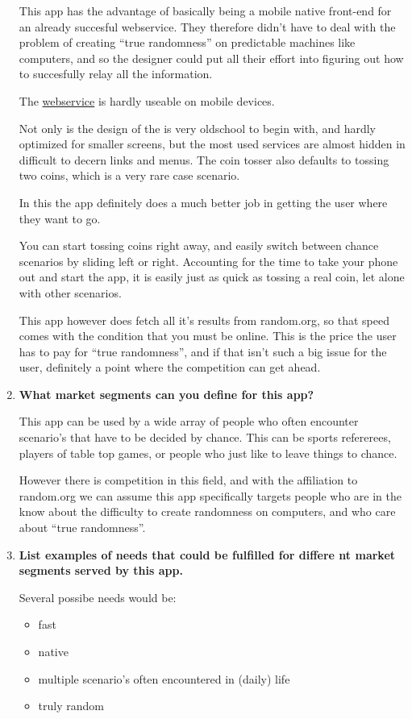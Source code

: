 \begin{enumerate}
    This app has the advantage of basically being a mobile native front-end for an already succesful webservice. 
    They therefore didn't have to deal with the problem of creating ``true randomness'' on predictable machines like computers, 
    and so the designer could put all their effort into figuring out how to succesfully relay all the information.

    The \href{https://www.random.org}{webservice} is hardly useable on mobile devices. 

    Not only is the design of the is very oldschool to begin with, and hardly optimized for smaller screens, but the most used services
    are almost hidden in difficult to decern links and menus.
    The coin tosser also defaults to tossing two coins, which is a very rare case scenario.

    In this the app definitely does a much better job in getting the user where they want to go. 
    
    You can start tossing coins right away, and easily switch between chance scenarios by sliding left or right. 
    Accounting for the time to take your phone out and start the app, it is easily just as quick as tossing a real coin, let alone with other scenarios.

    This app however does fetch all it's results from random.org, so that speed comes with the condition that you must be online. 
    This is the price the user has to pay for ``true randomness'', 
    and if that isn't such a big issue for the user, definitely a point where the competition can get ahead.


  \item \textbf{What market segments can you define for this app?}
    
    This app can be used by a wide array of people who often encounter scenario’s that have to be decided by chance. 
    This can be sports refererees, players of table top games, or people who just like to leave things to chance. 

    However there is competition in this field, and with the affiliation to random.org we can assume this app 
    specifically targets people who are in the know about the difficulty to create randomness on computers, and who care about “true randomness”.

 
  \item \textbf{List examples of needs that could be fulfilled for differe nt market segments served by this app.}
    
    Several possibe needs would be:
    \begin{itemize}
      \item fast
      \item native
      \item multiple scenario’s often encountered in (daily) life
      \item truly random
    \end{itemize}


\end{enumerate}

